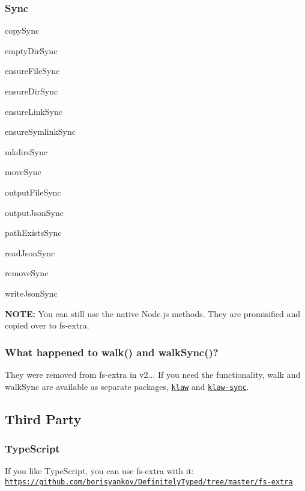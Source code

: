 \subsubsection*{Sync}


\begin{DoxyItemize}
\item copy\+Sync
\item empty\+Dir\+Sync
\item ensure\+File\+Sync
\item ensure\+Dir\+Sync
\item ensure\+Link\+Sync
\item ensure\+Symlink\+Sync
\item mkdirs\+Sync
\item move\+Sync
\item output\+File\+Sync
\item output\+Json\+Sync
\item path\+Exists\+Sync
\item read\+Json\+Sync
\item remove\+Sync
\item write\+Json\+Sync
\end{DoxyItemize}

{\bfseries N\+O\+TE\+:} You can still use the native Node.\+js methods. They are promisified and copied over to {\ttfamily fs-\/extra}.

\subsubsection*{What happened to {\ttfamily walk()} and {\ttfamily walk\+Sync()}?}

They were removed from {\ttfamily fs-\/extra} in v2... If you need the functionality, {\ttfamily walk} and {\ttfamily walk\+Sync} are available as separate packages, \href{https://github.com/jprichardson/node-klaw}{\tt {\ttfamily klaw}} and \href{https://github.com/manidlou/node-klaw-sync}{\tt {\ttfamily klaw-\/sync}}.

\subsection*{Third Party }

\subsubsection*{Type\+Script}

If you like Type\+Script, you can use {\ttfamily fs-\/extra} with it\+: \href{https://github.com/borisyankov/DefinitelyTyped/tree/master/fs-extra}{\tt https\+://github.\+com/borisyankov/\+Definitely\+Typed/tree/master/fs-\/extra}

